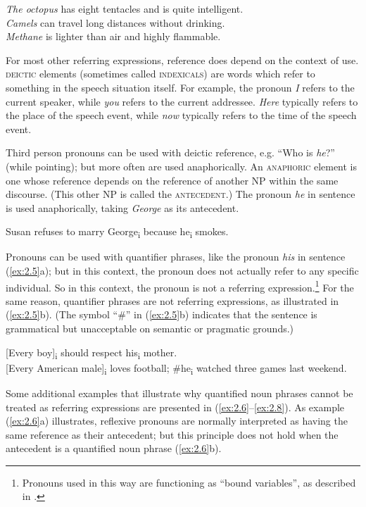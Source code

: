 \ea \label{ex:2.3}
\ea \textit{The octopus} has eight tentacles and is quite intelligent.\\
\ex \textit{Camels} can travel long distances without drinking.\\
\ex \textit{Methane} is lighter than air and highly flammable.
\z
\z


For most other referring expressions, reference does depend on the context of use. \textsc{deictic} elements (sometimes called \textsc{indexicals}) are words which refer to something in the speech situation itself. For example, the pronoun \textit{I} refers to the current speaker, while \textit{you} refers to the current addressee. \textit{Here} typically refers to the place of the speech event, while \textit{now} typically refers to the time of the speech event.



Third person pronouns can be used with deictic reference, e.g. “Who is \textit{he}?” (while pointing); but more often are used anaphorically. An \textsc{anaphoric} element is one whose reference depends on the reference of another NP within the same discourse. (This other NP is called the \textsc{antecedent}.) The pronoun \textit{he} in sentence  is used anaphorically, taking \textit{George} as its antecedent.


\ea \label{ex:2.4}
Susan refuses to marry George\textsubscript{i} because he\textsubscript{i} smokes.
\z


Pronouns can be used with quantifier phrases, like the pronoun \textit{his} in sentence (\ref{ex:2.5}a); but in this context, the pronoun does not actually refer to any specific individual. So in this context, the pronoun is not a referring expression.\footnote{Pronouns used in this way are functioning as “bound variables”, as described in .} For the same reason, quantifier phrases are not referring expressions, as illustrated in (\ref{ex:2.5}b). (The symbol “\#” in (\ref{ex:2.5}b) indicates that the sentence is grammatical but unacceptable on semantic or pragmatic grounds.)


\ea \label{ex:2.5}
\ea{} [Every boy]\textsubscript{i} should respect his\textsubscript{i} mother.\\        
\ex{} [Every American male]\textsubscript{i} loves football; \#he\textsubscript{i} watched three games last weekend.
\z
\z

Some additional examples that illustrate why quantified noun phrases cannot be treated as referring expressions are presented in (\ref{ex:2.6}--\ref{ex:2.8}). As example (\ref{ex:2.6}a) illustrates, reflexive pronouns are normally interpreted as having the same reference as their antecedent; but this principle does not hold when the antecedent is a quantified noun phrase (\ref{ex:2.6}b).


